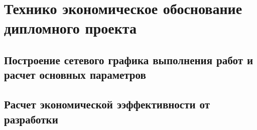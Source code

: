 \section{Технико экономическое обоснование дипломного проекта}

\subsection{Построение сетевого графика выполнения работ и расчет основных параметров}
\newpage
\setcounter{page}{57}
\subsection{Расчет экономической ээффективности от разработки}

\newpage